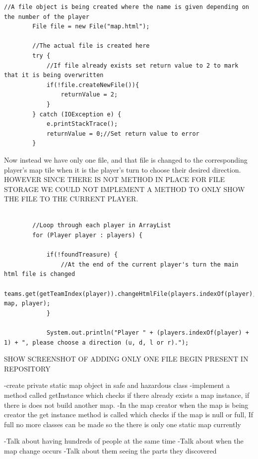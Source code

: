 \documentclass[a4paper,12pt]{extarticle}
\begin{document}
\begin{lstlisting}
//A file object is being created where the name is given depending on the number of the player
        File file = new File("map.html");

        //The actual file is created here
        try {
            //If file already exists set return value to 2 to mark that it is being overwritten
            if(!file.createNewFile()){
                returnValue = 2;
            }
        } catch (IOException e) {
            e.printStackTrace();
            returnValue = 0;//Set return value to error
        }
\end{lstlisting}
\vspace{4mm}

Now instead we have only one file, and that file is changed to the corresponding player's map tile when it is the player's turn to choose their desired direction.\\

HOWEVER SINCE THERE IS NOT METHOD IN PLACE FOR FILE STORAGE WE COULD NOT IMPLEMENT A METHOD TO ONLY SHOW THE FILE TO THE CURRENT PLAYER.

\begin{lstlisting}
 
        //Loop through each player in ArrayList
        for (Player player : players) {

            if(!foundTreasure) {
                //At the end of the current player's turn the main html file is changed
                teams.get(getTeamIndex(player)).changeHtmlFile(players.indexOf(player), map, player);
            }

            System.out.println("Player " + (players.indexOf(player) + 1) + ", please choose a direction (u, d, l or r).");
\end{lstlisting}

SHOW SCREENSHOT OF ADDING ONLY ONE FILE BEGIN PRESENT IN REPOSITORY


-create private static map object in safe and hazardous class
-implement a method called getInstance which checks if there already exists a map instance, if there is does not build another map.
-In the map creator when the map is being creator the get instance method is called which checks if the map is null or full,
If full no more classes can be made so the there is only one static map currently

-Talk about having hundreds of people at the same time
-Talk about when the map change occurs
-Talk about them seeing the parts they discovered
\end{document}
